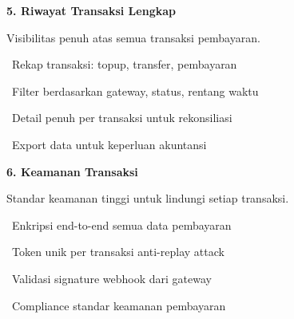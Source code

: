 \documentclass[a4paper]{article}
\begin{document}
\vspace{8pt}

\noindent
\begin{minipage}[t]{0.485\textwidth}
    \colorbox{OrangePrimary}{%
        \begin{minipage}{\dimexpr\textwidth-2\fboxsep\relax}
            {\fontsize{10}{13}\selectfont\bfseries\color{White} 5. Riwayat Transaksi Lengkap}
        \end{minipage}}\par
    \vspace{4pt}
    {\fontsize{9}{12}\selectfont\color{TextDark}%
    Visibilitas penuh atas semua transaksi pembayaran.\par\vspace{3pt}
    \textbullet\ Rekap transaksi: topup, transfer, pembayaran\par\vspace{2pt}%
    \textbullet\ Filter berdasarkan gateway, status, rentang waktu\par\vspace{2pt}%
    \textbullet\ Detail penuh per transaksi untuk rekonsiliasi\par\vspace{2pt}%
    \textbullet\ Export data untuk keperluan akuntansi}%
\end{minipage}%
\hfill
\begin{minipage}[t]{0.485\textwidth}
    \colorbox{GreenDark}{%
        \begin{minipage}{\dimexpr\textwidth-2\fboxsep\relax}
            {\fontsize{10}{13}\selectfont\bfseries\color{White} 6. Keamanan Transaksi}
        \end{minipage}}\par
    \vspace{4pt}
    {\fontsize{9}{12}\selectfont\color{TextDark}%
    Standar keamanan tinggi untuk lindungi setiap transaksi.\par\vspace{3pt}
    \textbullet\ Enkripsi end-to-end semua data pembayaran\par\vspace{2pt}%
    \textbullet\ Token unik per transaksi anti-replay attack\par\vspace{2pt}%
    \textbullet\ Validasi signature webhook dari gateway\par\vspace{2pt}%
    \textbullet\ Compliance standar keamanan pembayaran}%
\end{minipage}
\end{document}
